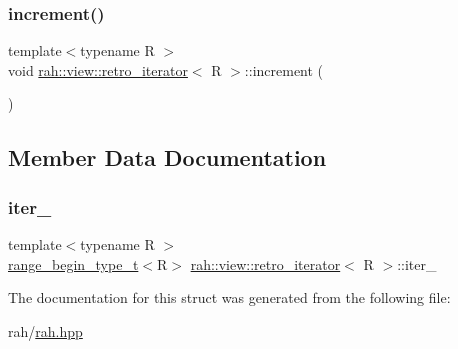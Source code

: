 \subsubsection{\texorpdfstring{increment()}{increment()}}
{\footnotesize\ttfamily template$<$typename R $>$ \\
void \mbox{\hyperlink{structrah_1_1view_1_1retro__iterator}{rah\+::view\+::retro\+\_\+iterator}}$<$ R $>$\+::increment (\begin{DoxyParamCaption}{ }\end{DoxyParamCaption})\hspace{0.3cm}{\ttfamily [inline]}}



\subsection{Member Data Documentation}
\mbox{\label{structrah_1_1view_1_1retro__iterator_a8c21328b89b978842df7951af4022393}} 
\subsubsection{\texorpdfstring{iter\_}{iter\_}}
{\footnotesize\ttfamily template$<$typename R $>$ \\
\mbox{\hyperlink{namespacerah_afa7f59d1f37c7b9d9caed37551be9eaa}{range\+\_\+begin\+\_\+type\+\_\+t}}$<$R$>$ \mbox{\hyperlink{structrah_1_1view_1_1retro__iterator}{rah\+::view\+::retro\+\_\+iterator}}$<$ R $>$\+::iter\+\_\+}



The documentation for this struct was generated from the following file\+:\begin{DoxyCompactItemize}
\item 
rah/\mbox{\hyperlink{rah_8hpp}{rah.\+hpp}}\end{DoxyCompactItemize}
